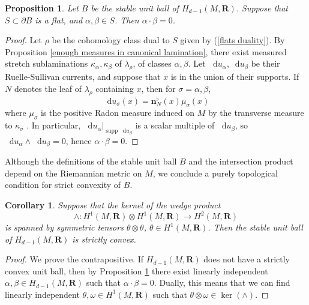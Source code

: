 \documentclass[reqno,11pt]{amsart}
\newcommand{\RR}{\mathbf{R}}
\newcommand*\dif{\mathop{}\!\mathrm{d}}
\DeclareMathOperator{\supp}{supp}
\newcommand{\normal}{\mathbf n}
\newtheorem{proposition}[theorem]{Proposition}
\newtheorem{corollary}[theorem]{Corollary}
\theoremstyle{definition}
\numberwithin{equation}{section}
\begin{document}
\begin{proposition}\label{flats are nonintersecting}
Let $B$ be the stable unit ball of $H_{d - 1}(M, \RR)$.
Suppose that $S \subset \partial B$ is a flat, and $\alpha, \beta \in S$. Then $\alpha \cdot \beta = 0$.
\end{proposition}
\begin{proof}
Let $\rho$ be the cohomology class dual to $S$ given by (\ref{flats duality}).
By Proposition \ref{enough measures in canonical lamination}, there exist measured stretch sublaminations $\kappa_\alpha, \kappa_\beta$ of $\lambda_\rho$, of classes $\alpha, \beta$.
Let $\dif u_\alpha, \dif u_\beta$ be their Ruelle-Sullivan currents, and suppose that $x$ is in the union of their supports.
If $N$ denotes the leaf of $\lambda_\rho$ containing $x$, then for $\sigma = \alpha, \beta$,
$$\dif u_\sigma(x) = \normal_N^\flat(x) \mu_\sigma(x)$$
where $\mu_\sigma$ is the positive Radon measure induced on $M$ by the transverse measure to $\kappa_\sigma$ \cite[Lemma 3.1]{BackusCML}.
In particular, $\dif u_\alpha|_{\supp \dif u_\beta}$ is a scalar multiple of $\dif u_\beta$, so $\dif u_\alpha \wedge \dif u_\beta = 0$, hence $\alpha \cdot \beta = 0$.
\end{proof}

Although the definitions of the stable unit ball $B$ and the intersection product depend on the Riemannian metric on $M$, we conclude a purely topological condition for strict convexity of $B$.

\begin{corollary}\label{condition for strict convexity}
Suppose that the kernel of the wedge product 
\begin{equation}\label{wedge product}
\wedge: H^1(M, \RR) \otimes H^1(M, \RR) \to H^2(M, \RR)
\end{equation}
is spanned by symmetric tensors $\theta \otimes \theta$, $\theta \in H^1(M, \RR)$.
Then the stable unit ball of $H_{d - 1}(M, \RR)$ is strictly convex.
\end{corollary}
\begin{proof}
We prove the contrapositive.
If $H_{d - 1}(M, \RR)$ does not have a strictly convex unit ball, then by Proposition \ref{flats are nonintersecting} there exist linearly independent $\alpha, \beta \in H_{d - 1}(M, \RR)$ such that $\alpha \cdot \beta = 0$.
Dually, this means that we can find linearly independent $\theta, \omega \in H^1(M, \RR)$ such that $\theta \otimes \omega \in \ker(\wedge)$.
\end{proof}
\end{document}
